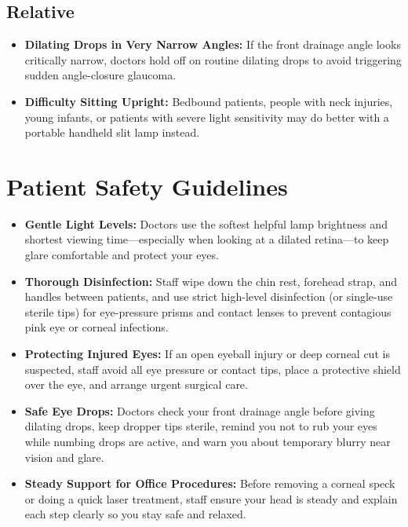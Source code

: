 \subsection{Relative}

\begin{itemize}
    \item \textbf{Dilating Drops in Very Narrow Angles:} If the front drainage angle looks critically narrow, doctors hold off on routine dilating drops to avoid triggering sudden angle-closure glaucoma.
    \item \textbf{Difficulty Sitting Upright:} Bedbound patients, people with neck injuries, young infants, or patients with severe light sensitivity may do better with a portable handheld slit lamp instead.
\end{itemize}

\section{Patient Safety Guidelines}

\begin{itemize}
    \item \textbf{Gentle Light Levels:} Doctors use the softest helpful lamp brightness and shortest viewing time---especially when looking at a dilated retina---to keep glare comfortable and protect your eyes.
    \item \textbf{Thorough Disinfection:} Staff wipe down the chin rest, forehead strap, and handles between patients, and use strict high-level disinfection (or single-use sterile tips) for eye-pressure prisms and contact lenses to prevent contagious pink eye or corneal infections.
    \item \textbf{Protecting Injured Eyes:} If an open eyeball injury or deep corneal cut is suspected, staff avoid all eye pressure or contact tips, place a protective shield over the eye, and arrange urgent surgical care.
    \item \textbf{Safe Eye Drops:} Doctors check your front drainage angle before giving dilating drops, keep dropper tips sterile, remind you not to rub your eyes while numbing drops are active, and warn you about temporary blurry near vision and glare.
    \item \textbf{Steady Support for Office Procedures:} Before removing a corneal speck or doing a quick laser treatment, staff ensure your head is steady and explain each step clearly so you stay safe and relaxed.
\end{itemize}

